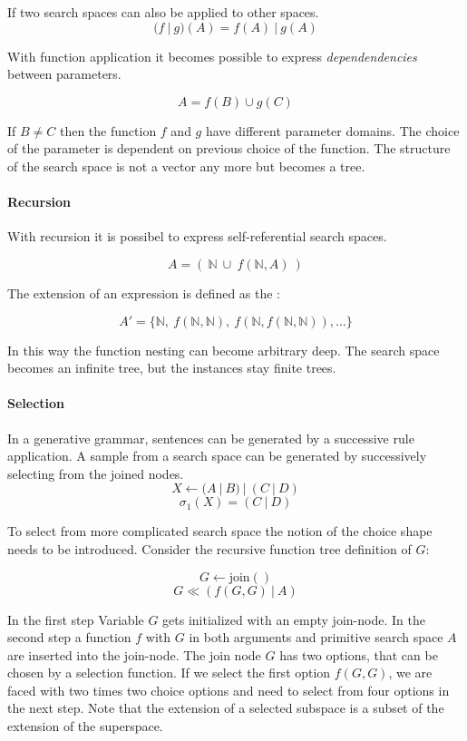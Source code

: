 \documentclass[english]{article}
\begin{document}
If two search spaces can also be applied to other spaces.
$$(f\ |\ g)(A) = f(A)\ |\ g(A)$$

With function application it becomes possible to express \textit{dependendencies} between parameters.

$$A = f(B) \cup g(C)$$

If $B \neq C$ then the function $f$ and $g$ have different parameter domains. The choice of the parameter is dependent on previous choice of the function.  The structure of the search space is not a vector any more but becomes a tree.



\paragraph{Recursion}
With recursion it is possibel to express self-referential search spaces.

$$ A = (\ \mathbb{N}\ \cup\ f(\mathbb{N}, A)\ ) $$

The extension of an expression is defined as the  :

$$ A' = \{\mathbb{N},\ f(\mathbb{N}, \mathbb{N}),\ f(\mathbb{N}, f(\mathbb{N}, \mathbb{N})), ... \}$$

In this way the function nesting can become arbitrary deep. The search space becomes an infinite tree, but the instances stay finite trees.

\paragraph{Selection}
In a generative grammar, sentences can be generated by a successive rule application. A sample from a search space can be generated by successively selecting from the joined nodes.
$$X \leftarrow (A\ |\ B)\ |\ (C\ |\ D)$$
$$\sigma_1(X) = (C\ |\ D)$$

To select from more complicated search space the notion of the choice shape needs to be introduced. Consider the recursive function tree definition of $G$:

$$ G \leftarrow \operatorname{join()}$$
$$ G \ll (f(G,G)\ |\ A)$$

In the first step Variable $G$ gets initialized with an empty join-node. In the second step a function $f$ with $G$ in both arguments and primitive search space $A$ are inserted into the join-node. The join node $G$ has two options, that can be chosen by a selection function. If we select the first option $f(G,G)$, we are faced with two times two choice options and need to select from four options in the next step. Note that the extension of a selected subspace is a subset of the extension of the superspace.
\end{document}

